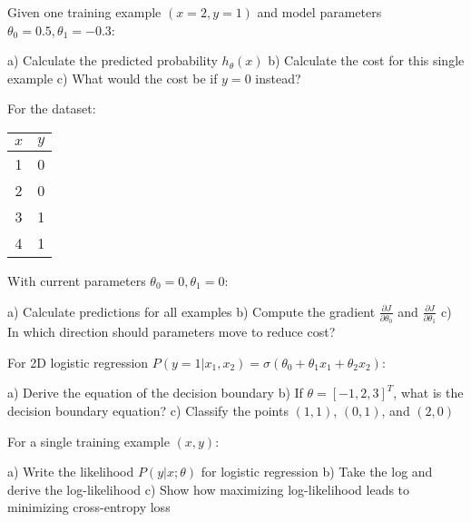 \documentclass{article}
\newcounter{exercise}
\begin{document}
\begin{tcolorbox}[colback=gray!5!white,colframe=gray!75!black,title=Problem \stepcounter{exercise}: Cost Function Calculation]

Given one training example $(x=2, y=1)$ and model parameters $\theta_0 = 0.5, \theta_1 = -0.3$:

a) Calculate the predicted probability $h_\theta(x)$
b) Calculate the cost for this single example
c) What would the cost be if $y=0$ instead?
\end{tcolorbox}

\begin{tcolorbox}[colback=gray!5!white,colframe=gray!75!black,title=Problem \stepcounter{exercise}: Gradient Computation]

For the dataset:
\begin{center}
\begin{tabular}{|c|c|}
\hline
$x$ & $y$ \\
\hline
1 & 0 \\
2 & 0 \\
3 & 1 \\
4 & 1 \\
\hline
\end{tabular}
\end{center}

With current parameters $\theta_0 = 0, \theta_1 = 0$:

a) Calculate predictions for all examples
b) Compute the gradient $\frac{\partial J}{\partial \theta_0}$ and $\frac{\partial J}{\partial \theta_1}$
c) In which direction should parameters move to reduce cost?
\end{tcolorbox}

\begin{tcolorbox}[colback=gray!5!white,colframe=gray!75!black,title=Problem \stepcounter{exercise}: Decision Boundary]

For 2D logistic regression $P(y=1|x_1,x_2) = \sigma(\theta_0 + \theta_1 x_1 + \theta_2 x_2)$:

a) Derive the equation of the decision boundary
b) If $\theta = [-1, 2, 3]^T$, what is the decision boundary equation?
c) Classify the points $(1,1)$, $(0,1)$, and $(2,0)$
\end{tcolorbox}

\begin{tcolorbox}[colback=gray!5!white,colframe=gray!75!black,title=Problem \stepcounter{exercise}: Maximum Likelihood Derivation]

For a single training example $(x,y)$:

a) Write the likelihood $P(y|x;\theta)$ for logistic regression
b) Take the log and derive the log-likelihood
c) Show how maximizing log-likelihood leads to minimizing cross-entropy loss
\end{tcolorbox}
\end{document}
